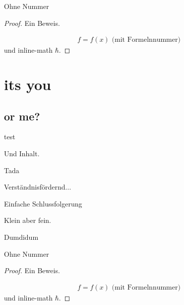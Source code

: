 \documentclass[ngerman,a4paper]{report}
\theoremstyle{break}
\numberwithin{dummy}{section}
\begin{document}
\begin{*trueexample}[Test]
	Ohne Nummer
\end{*trueexample}

\begin{proof}
	Ein Beweis.
	
	\begin{align}
		f = f(x) \text{ (mit Formelnnummer)}
	\end{align}
	und inline-math $\hbar$.
\end{proof}

\chapter{its you}

\section{or me?}

\begin{truetheorem}
    test
\end{truetheorem}

\begin{trueproposition}
    Und Inhalt.
\end{trueproposition}

\begin{truedefinition}
    Tada
\end{truedefinition}

\begin{trueexample}
    Verständnisfördernd...
\end{trueexample}

\begin{trueconclusion}[Ergänzung]
    Einfache Schlussfolgerung
\end{trueconclusion}

\begin{truelemma}
    Klein aber fein.
\end{truelemma}

\begin{trueremark}[Hossa]
    Dumdidum
\end{trueremark}

\begin{*trueexample}[Test]
    Ohne Nummer
\end{*trueexample}

\begin{proof}
    Ein Beweis.
    
    \begin{align}
    f = f(x) \text{ (mit Formelnnummer)}
    \end{align}
    und inline-math $\hbar$.
\end{proof}

\end{document}
